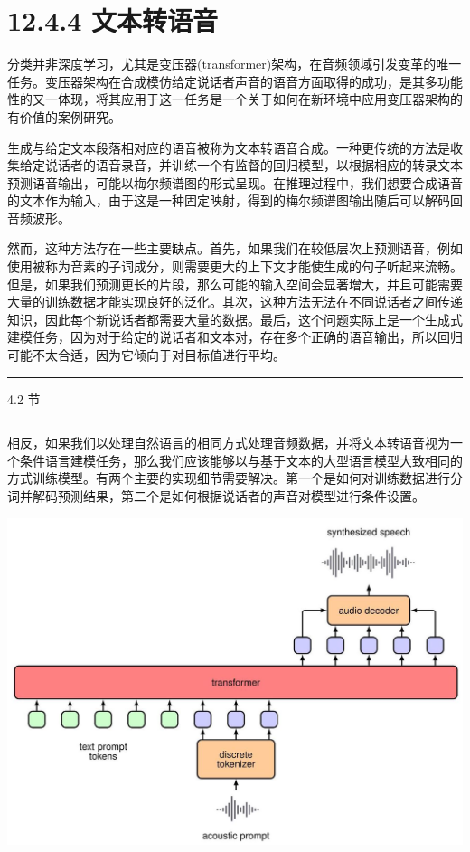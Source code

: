 \documentclass[10pt]{article}
\newcommand{\HRule}{\begin{center}\rule{0.9\linewidth}{0.2mm}\end{center}}
\begin{document}
\section*{12.4.4 文本转语音}

分类并非深度学习，尤其是变压器(transformer)架构，在音频领域引发变革的唯一任务。变压器架构在合成模仿给定说话者声音的语音方面取得的成功，是其多功能性的又一体现，将其应用于这一任务是一个关于如何在新环境中应用变压器架构的有价值的案例研究。

生成与给定文本段落相对应的语音被称为文本转语音合成。一种更传统的方法是收集给定说话者的语音录音，并训练一个有监督的回归模型，以根据相应的转录文本预测语音输出，可能以梅尔频谱图的形式呈现。在推理过程中，我们想要合成语音的文本作为输入，由于这是一种固定映射，得到的梅尔频谱图输出随后可以解码回音频波形。

然而，这种方法存在一些主要缺点。首先，如果我们在较低层次上预测语音，例如使用被称为音素的子词成分，则需要更大的上下文才能使生成的句子听起来流畅。但是，如果我们预测更长的片段，那么可能的输入空间会显著增大，并且可能需要大量的训练数据才能实现良好的泛化。其次，这种方法无法在不同说话者之间传递知识，因此每个新说话者都需要大量的数据。最后，这个问题实际上是一个生成式建模任务，因为对于给定的说话者和文本对，存在多个正确的语音输出，所以回归可能不太合适，因为它倾向于对目标值进行平均。

\HRule

4.2 节

\HRule

相反，如果我们以处理自然语言的相同方式处理音频数据，并将文本转语音视为一个条件语言建模任务，那么我们应该能够以与基于文本的大型语言模型大致相同的方式训练模型。有两个主要的实现细节需要解决。第一个是如何对训练数据进行分词并解码预测结果，第二个是如何根据说话者的声音对模型进行条件设置。

\begin{center}
\includegraphics[max width=1.0\textwidth]{images/0194e279-9b28-703a-88f4-c3ac21e2010d_420_244_339_1304_936_0.jpg}
\end{center}
\hspace*{3em} 
\end{document}
